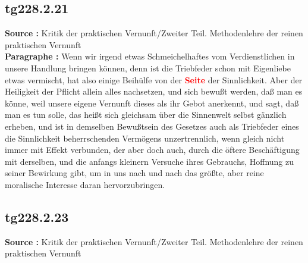 \documentclass[a4paper,12pt,twoside]{book}
\newcommand{\match}[1]{\textcolor{red}{\textbf{#1}}}
\begin{document}
	\subsection*{tg228.2.21} 
	\textbf{Source : }Kritik der praktischen Vernunft/Zweiter Teil. Methodenlehre der reinen praktischen Vernunft\\  
	
	\noindent\textbf{Paragraphe : }Wenn wir irgend etwas Schmeichelhaftes vom Verdienstlichen in unsere Handlung bringen können, denn ist die Triebfeder schon mit Eigenliebe etwas vermischt, hat also einige Beihülfe von der \match{Seite} der Sinnlichkeit. Aber der Heiligkeit der Pflicht allein alles nachsetzen, und sich bewußt werden, daß man es könne, weil unsere eigene Vernunft dieses als ihr Gebot anerkennt, und sagt, daß man es tun solle, das heißt sich gleichsam über die Sinnenwelt selbst gänzlich erheben, und ist in demselben Bewußtsein des Gesetzes auch als Triebfeder eines die Sinnlichkeit beherrschenden Vermögens unzertrennlich, wenn gleich nicht immer mit Effekt verbunden, der aber doch auch, durch die öftere Beschäftigung mit derselben, und die anfangs kleinern Versuche ihres Gebrauchs, Hoffnung zu seiner  Bewirkung gibt, um in uns nach und nach das größte, aber reine moralische Interesse daran hervorzubringen. 
	
	\subsection*{tg228.2.23} 
	\textbf{Source : }Kritik der praktischen Vernunft/Zweiter Teil. Methodenlehre der reinen praktischen Vernunft\\  
	
\end{document}
